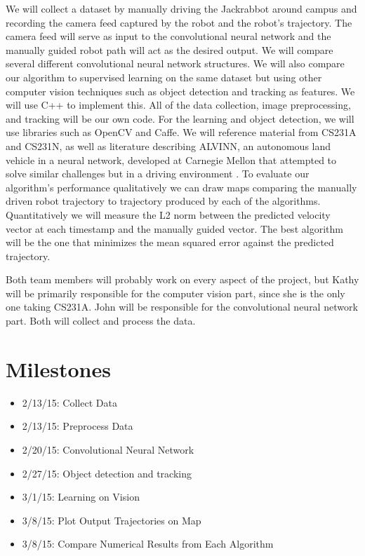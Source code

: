 \documentclass[12pt]{article}
\begin{document}
We will collect a dataset by manually driving the Jackrabbot around campus and recording the camera feed captured by the robot and the robot's trajectory. The camera feed will serve as input to the convolutional neural network and the manually guided robot path will act as the desired output. We will compare several different convolutional neural network structures.   We will also compare our algorithm to supervised learning on the same dataset but using other computer vision techniques such as object detection and tracking as features. We will use C++ to implement this. All of the data collection, image preprocessing, and tracking will be our own code. For the learning and object detection, we will use libraries such as OpenCV and Caffe. We will reference material from CS231A and CS231N, as well as literature describing ALVINN, an autonomous land vehicle in a neural network, developed at Carnegie Mellon that attempted to solve similar challenges but in a driving environment \cite{ALVINN}. To evaluate our algorithm's performance qualitatively we can draw maps comparing the manually driven robot trajectory to trajectory produced by each of the algorithms. Quantitatively we will measure the L2 norm between the predicted velocity vector at each timestamp and the manually guided vector. The best algorithm will be the one that minimizes the mean squared error against the predicted trajectory.

Both team members will probably work on every aspect of the project, but Kathy will be primarily responsible for the computer vision part, since she is the only one taking CS231A. John will be responsible for the convolutional neural network part. Both will collect and process the data.

\section{Milestones}
\begin{itemize}
\item 2/13/15: Collect Data
\item 2/13/15: Preprocess Data
\item 2/20/15: Convolutional Neural Network
\item 2/27/15: Object detection and tracking
\item 3/1/15: Learning on Vision
\item 3/8/15: Plot Output Trajectories on Map
\item 3/8/15: Compare Numerical Results from Each Algorithm
\end{itemize}
\end{document}
